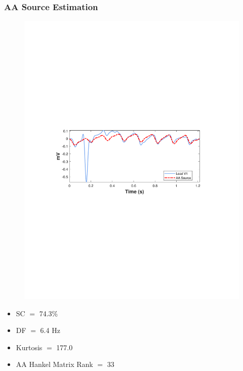\documentclass{beamer}
\begin{document}
	\begin{frame}
		\frametitle{AA Source Estimation}
		
		\vspace{-1.5cm}
		\begin{figure}[!ht]
			\centering
			\includegraphics[scale=0.75,trim={3.0cm 8.5cm 3.0cm 8.5cm},clip=true]{example_Source.pdf}
		\end{figure}
		\vspace{-2.0cm}
		
		\begin{itemize}
			\item SC $=$ 74.3\%
			\item DF $=$ 6.4 Hz
			\item Kurtosis $=$ 177.0
			\item AA Hankel Matrix Rank $=$ 33
		\end{itemize}
		
	\end{frame}

\end{document}
